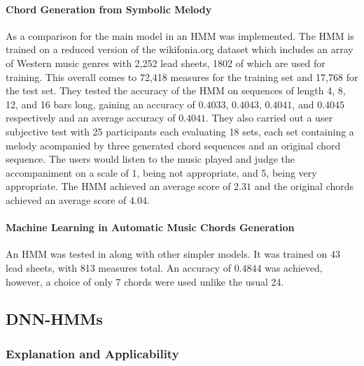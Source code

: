 \paragraph{Chord Generation from Symbolic Melody}  As a comparison for the main model in \cite{BLSTM} an HMM was implemented. 
The HMM is trained on a reduced version of the %
wikifonia.org dataset which includes an array of Western music genres with 2,252 lead sheets, 1802 of which are used for training. 
This overall comes to 72,418 measures for the training set and 17,768 for the test set. 
They tested the accuracy of the HMM on sequences of length 4, 8, 12, and 16 bars long, gaining an accuracy of $0.4033$, $0.4043$, $0.4041$, and $0.4045$ respectively and an average accuracy of $0.4041$.
They also carried out a user subjective test with 25 participants each evaluating 18 sets, each set containing a melody acompanied by three generated chord sequences and an original chord sequence.
The users would listen to the music played and judge the accompaniment on a scale of 1, being not appropriate, and 5, being very appropriate.
The HMM achieved an average score of $2.31$ and the original chords achieved an average score of $4.04$.

\paragraph{Machine Learning in Automatic Music Chords Generation} An HMM was tested in \cite{MLForChords} along with other simpler models. It was trained on 43 lead sheets, with 813 measures total. 
An accuracy of $0.4844$ was achieved, however, a choice of only 7 chords were used unlike the usual 24.


\subsection{DNN-HMMs}

\label{subsec:DNN-HMMs}
\subsubsection{Explanation and Applicability} 

